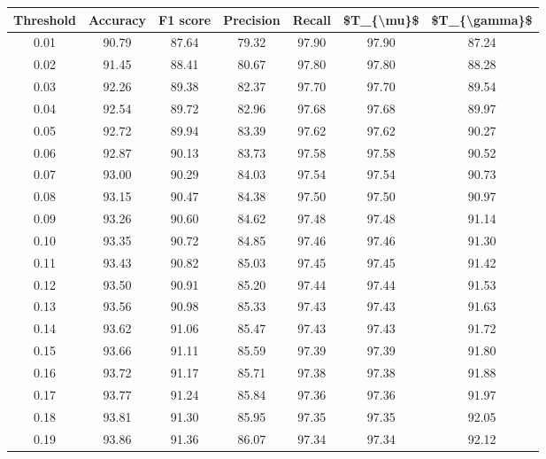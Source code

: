 \begin{tabular}{|c|c|c|c|c|c|c|}
\hline
 Threshold &  Accuracy &  F1 score &  Precision &  Recall &  \$T\_\{\textbackslash mu\}\$ &  \$T\_\{\textbackslash gamma\}\$ \\
\hline
      0.01 &     90.79 &     87.64 &      79.32 &   97.90 &      97.90 &         87.24 \\
      0.02 &     91.45 &     88.41 &      80.67 &   97.80 &      97.80 &         88.28 \\
      0.03 &     92.26 &     89.38 &      82.37 &   97.70 &      97.70 &         89.54 \\
      0.04 &     92.54 &     89.72 &      82.96 &   97.68 &      97.68 &         89.97 \\
      0.05 &     92.72 &     89.94 &      83.39 &   97.62 &      97.62 &         90.27 \\
      0.06 &     92.87 &     90.13 &      83.73 &   97.58 &      97.58 &         90.52 \\
      0.07 &     93.00 &     90.29 &      84.03 &   97.54 &      97.54 &         90.73 \\
      0.08 &     93.15 &     90.47 &      84.38 &   97.50 &      97.50 &         90.97 \\
      0.09 &     93.26 &     90.60 &      84.62 &   97.48 &      97.48 &         91.14 \\
      0.10 &     93.35 &     90.72 &      84.85 &   97.46 &      97.46 &         91.30 \\
      0.11 &     93.43 &     90.82 &      85.03 &   97.45 &      97.45 &         91.42 \\
      0.12 &     93.50 &     90.91 &      85.20 &   97.44 &      97.44 &         91.53 \\
      0.13 &     93.56 &     90.98 &      85.33 &   97.43 &      97.43 &         91.63 \\
      0.14 &     93.62 &     91.06 &      85.47 &   97.43 &      97.43 &         91.72 \\
      0.15 &     93.66 &     91.11 &      85.59 &   97.39 &      97.39 &         91.80 \\
      0.16 &     93.72 &     91.17 &      85.71 &   97.38 &      97.38 &         91.88 \\
      0.17 &     93.77 &     91.24 &      85.84 &   97.36 &      97.36 &         91.97 \\
      0.18 &     93.81 &     91.30 &      85.95 &   97.35 &      97.35 &         92.05 \\
      0.19 &     93.86 &     91.36 &      86.07 &   97.34 &      97.34 &         92.12 \\

\end{tabular}
